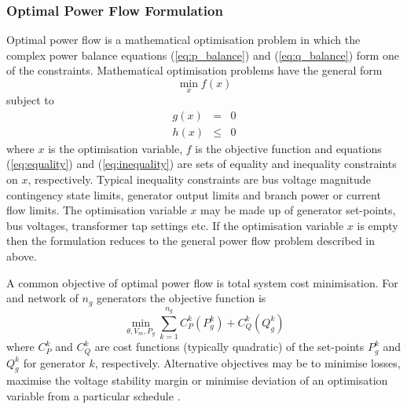 \subsubsection{Optimal Power Flow Formulation}
Optimal power flow is a mathematical optimisation problem in which the complex
power balance equations (\ref{eq:p_balance}) and (\ref{eq:q_balance}) form one
of the constraints. Mathematical optimisation problems have the general form
\begin{equation}
\min_x f(x)
\end{equation}
subject to
\begin{eqnarray}
\label{eq:equality}
g(x)& =& 0\\
\label{eq:inequality}
h(x)& \leq& 0
\end{eqnarray}
where $x$ is the optimisation variable, $f$ is the objective function and
equations (\ref{eq:equality}) and (\ref{eq:inequality}) are sets of equality
and inequality constraints on $x$, respectively.  Typical inequality
constraints are bus voltage magnitude contingency state limits, generator
output limits and branch power or current flow limits.  The optimisation
variable $x$ may be made up of generator set-points, bus voltages, transformer
tap settings etc.  If the optimisation variable $x$ is empty then the
formulation reduces to the general power flow problem described in above.

A common objective of optimal power flow is total system cost minimisation.
For and network of $n_g$ generators the objective function is
\begin{equation}
\label{eq:objfunc}
\min_{\theta, V_m, P_g} \sum_{k=1}^{n_g} C^k_P(P_g^k) + C_Q^k(Q_g^k)
\end{equation}
where $C_P^k$ and $C_Q^k$ are cost functions (typically quadratic) of the
set-points $P_g^k$ and $Q_g^k$ for generator $k$, respectively. Alternative
objectives may be to minimise losses, maximise the voltage stability margin or
minimise deviation of an optimisation variable from a particular schedule
\cite[\S18]{kallrath:2009}.

